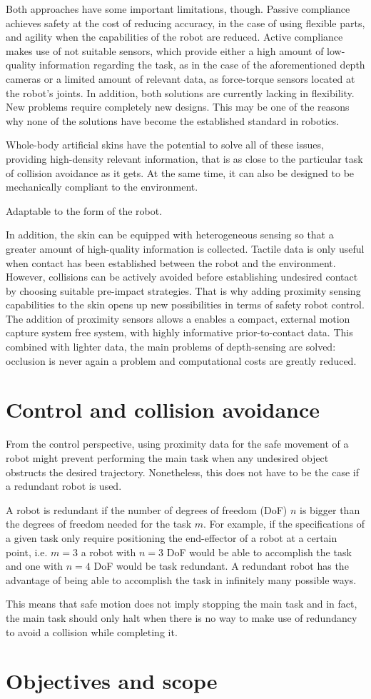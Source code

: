 Both approaches have some important limitations, though. Passive compliance achieves safety at the cost of reducing accuracy, in the case of using flexible parts, and agility when the capabilities of the robot are reduced. Active compliance makes use of not suitable sensors, which provide either a high amount of low-quality information regarding the task, as in the case of the aforementioned depth cameras or a limited amount of relevant data, as force-torque sensors located at the robot’s joints. In addition, both solutions are currently lacking in flexibility. New problems require completely new designs. This may be one of the reasons why none of the solutions have become the established standard in robotics.

Whole-body artificial skins have the potential to solve all of these issues, providing high-density relevant information, that is as close to the particular task of collision avoidance as it gets. At the same time, it can also be designed to be mechanically compliant to the environment.

Adaptable to the form of the robot.

In addition, the skin can be equipped with heterogeneous sensing so that a greater amount of high-quality information is collected. Tactile data is only useful when contact has been established between the robot and the environment. However, collisions can be actively avoided before establishing undesired contact by choosing suitable pre-impact strategies. That is why adding proximity sensing capabilities to the skin opens up new possibilities in terms of safety robot control. The addition of proximity sensors allows a enables a compact, external motion capture system free system, with highly informative prior-to-contact data. This combined with lighter data, the main problems of depth-sensing are solved: occlusion is never again a problem and computational costs are greatly reduced.
\section{Control and collision avoidance}
From the control perspective, using proximity data for the safe movement of a robot might prevent performing the main task when any undesired object obstructs the desired trajectory. Nonetheless, this does not have to be the case if a redundant robot is used.

A robot is redundant if the number of degrees of freedom (DoF) $n$ is bigger than the degrees of freedom needed for the task $m$. For example, if the specifications of a given task only require positioning the end-effector of a robot at a certain point, i.e. $m = 3$ a robot with $n = 3$ DoF would be able to accomplish the task and one with $n = 4$ DoF would be task redundant. A redundant robot has the advantage of being able to accomplish the task in infinitely many possible ways.

This means that safe motion does not imply stopping the main task and in fact, the main task should only halt when there is no way to make use of redundancy to avoid a collision while completing it.

\section{Objectives and scope}
